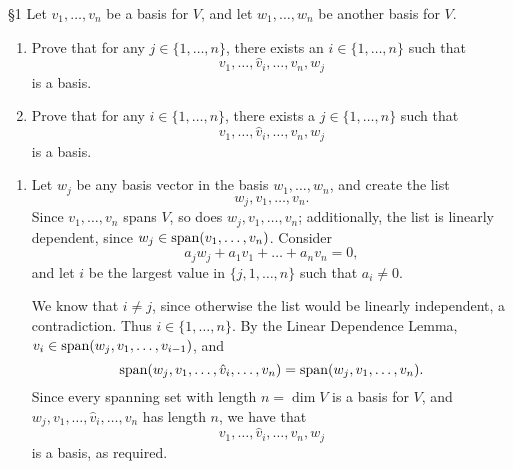 \documentclass{homework}
\begin{document}
\begin{problem}{\S 1}
  Let $v_1,\ldots,v_n$ be a basis for $V$, and let $w_1,\ldots,w_n$ be another basis for $V$.
  \begin{enumerate}[label=(\alph*)]
    \item Prove that for any $j\in \{ 1,\ldots,n \}$, there exists an $i\in \{ 1,\ldots,n \}$ such
      that \[
        v_1,\ldots,\hat{v}_i,\ldots,v_n,w_j
      \] is a basis.
    \item Prove that for any $i\in \{ 1,\ldots,n \}$, there exists a $j\in \{ 1,\ldots,n \}$ such
      that \[
        v_1,\ldots,\hat{v}_i, \ldots,v_n, w_j
      \] is a basis.
  \end{enumerate}
\end{problem}

\begin{solution}
  \begin{enumerate}[label=(\alph*)]
    \item Let $w_j$ be any basis vector in the basis $ w_1,\ldots,w_n$, and create the list \[
      w_j, v_1,\ldots,v_n
      .\] Since $v_1,\ldots,v_n$ spans $V$, so does $w_j,v_1,\ldots,v_n$; additionally, the list is
      linearly dependent, since $w_j\in \operatorname{span}(v_1,\ldots,v_n)$. Consider \[
        a_jw_j+a_1v_1+\ldots+a_nv_n=0
      ,\] and let $i$ be the largest value in $\{ j,1,\ldots,n \}$ such that $a_i\neq 0$.

      We know that $i\neq j$, since otherwise the list would be linearly independent, a contradiction.
      Thus $i\in \{ 1,\ldots,n \}$. By the Linear Dependence Lemma, $v_i\in
      \operatorname{span}(w_j,v_1,\ldots,v_{i-1}) $, and \[
        \operatorname{span}(w_j,v_1,\ldots,\hat{v}_i,\ldots,v_n) =\operatorname{span}(w_j,v_1,\ldots,v_n)
      .\] Since every spanning set with length $n=\dim{V}$ is a basis for
      $V$, and $w_j, v_1,\ldots,\hat{v}_i,\ldots,v_n$ has length $n$, we have that \[
          v_1,\ldots,\hat{v}_i,\ldots,v_n,w_j
      \] is a basis, as required.


\end{enumerate}
\end{solution}
\end{document}
